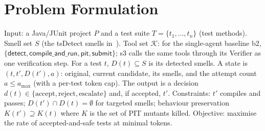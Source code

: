 \documentclass[conference]{IEEEtran}
\begin{document}
\section{Problem Formulation}
Input: a Java/JUnit project $P$ and a test suite $T=\{t_1,\dots,t_n\}$ (test methods). Smell set $S$ (the tsDetect smells in~\cite{utrefactor}).
Tool set $\mathcal{K}$: for the single-agent baseline \textsf{b2}, $\{\textsf{detect},\textsf{compile\_and\_run},\textsf{pit},\textsf{submit}\}$; \textsf{s3} calls the same tools through its Verifier as one verification step.
For a test $t$, $D(t)\subseteq S$ is its detected smells. A state is $(t, t', D(t'), a)$: original, current candidate,
its smells, and the attempt count $a\le a_{\max}$ (with a per-test token cap). The output is a decision
$d(t)\in\{\text{accept},\text{reject},\text{escalate}\}$ and, if accepted, $t'$.
Constraints: $t'$ compiles and passes; $D(t')\cap D(t)=\emptyset$ for targeted smells; behaviour preservation
$K(t')\supseteq K(t)$ where $K$ is the set of PIT mutants killed. Objective: maximise the rate of accepted-and-safe tests at minimal tokens.
\end{document}
